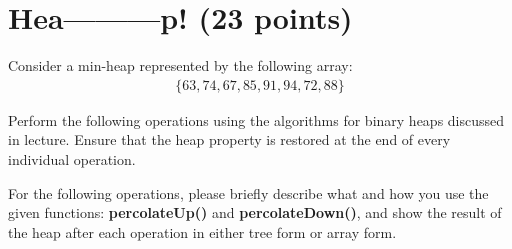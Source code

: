 \documentclass[11pt]{exam}
\begin{document}
\section{Hea---------p! (23 points)}
Consider a min-heap represented by the following array:
\begin{align*}
\{63,74,67,85,91,94,72,88\}
\end{align*}

Perform the following operations using the algorithms for binary heaps discussed in lecture. Ensure that the heap property is restored at the end of every individual operation.

For the following operations, please briefly describe what and how you use the given functions: \textbf{percolateUp()} and \textbf{percolateDown()}, and show the result of the heap after each operation in either tree form or array form.
\end{document}
